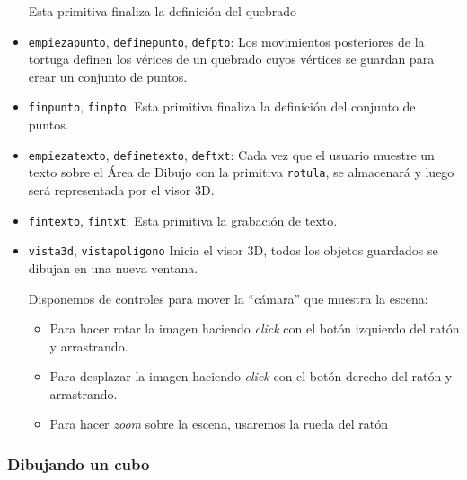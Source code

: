 \begin{itemize}
      Esta primitiva finaliza la definici\'on del quebrado
   \item \texttt{empiezapunto}, \texttt{definepunto}, \texttt{defpto}:%
      Los movimientos posteriores de la tortuga definen los v\'erices de un
      quebrado cuyos v\'ertices se guardan para crear un conjunto de puntos.
   \item \texttt{finpunto}, \texttt{finpto}:%
       Esta primitiva 
      finaliza la definici\'on del conjunto de puntos.
   \item \texttt{empiezatexto}, \texttt{definetexto}, \texttt{deftxt}:%
      Cada vez que el usuario muestre un texto sobre el \'Area de Dibujo con
      la primitiva \texttt{rotula}, se almacenar\'a y luego ser\'a representada
      por el visor 3D.
   \item \texttt{fintexto}, \texttt{fintxt}:%
       Esta primitiva
      la grabaci\'on de texto.
   \item \texttt{vista3d}, \texttt{vistapol\'igono}%
      Inicia el visor 3D, todos los objetos guardados se dibujan en una nueva
      ventana.

      Disponemos de controles para mover la ``c\'amara'' que muestra la escena:
      \begin{itemize}
         \item Para hacer rotar la imagen haciendo \textit{click} con el bot\'on
            izquierdo del rat\'on y arrastrando.
         \item Para desplazar la imagen haciendo \textit{click} con el bot\'on
            derecho del rat\'on y arrastrando.
         \item Para hacer \textit{zoom} sobre la escena, usaremos la rueda del
            rat\'on
      \end{itemize}
\end{itemize}

\subsubsection{Dibujando un cubo}

